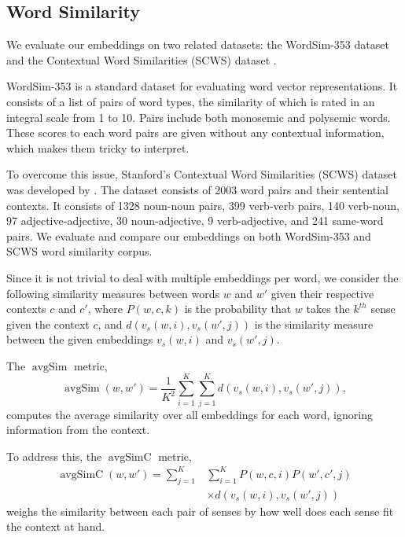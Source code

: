 \documentclass[11pt,a4paper]{article}
\DeclareMathOperator*{\avgSim}{avgSim}
\DeclareMathOperator*{\avgSimC}{avgSimC}
\begin{document}
\subsection{Word Similarity}
\label{sec:word-similarity}

We evaluate our embeddings on two related datasets: the WordSim-353
\cite{finkelstein:2001} dataset and the Contextual Word Similarities
(SCWS) dataset .

WordSim-353 is a standard dataset for evaluating word vector
representations. It consists of a list of pairs of word types, the
similarity of which is rated in an integral scale from 1 to 10. Pairs
include both monosemic and polysemic words. These scores to each word
pairs are given without any contextual information, which makes them
tricky to interpret. 

To overcome this issue, Stanford's Contextual Word Similarities (SCWS)
dataset was developed by . The dataset consists of
2003 word pairs and their sentential contexts. It consists of 1328
noun-noun pairs, 399 verb-verb pairs, 140 verb-noun, 97
adjective-adjective, 30 noun-adjective, 9 verb-adjective, and 241
same-word pairs. We evaluate and compare our embeddings on both
WordSim-353 and SCWS word similarity corpus.

Since it is not trivial to deal with multiple embeddings per word, we
consider the following similarity measures between words $w$ and $w'$
given their respective contexts $c$ and $c'$, where $P(w, c, k)$ is
the probability that $w$ takes the $k^{th}$ sense given the context
$c$, and $d(v_s(w, i), v_s(w', j))$ is the similarity measure between
the given embeddings $v_s(w, i)$ and $v_s(w', j)$.

The $\avgSim$ metric,
\begin{dmath*}
\avgSim(w, w') = 
    \frac{1}{K^{2}} \sum_{i=1}^{K} \sum_{j=1}^{K} d\left(v_s(w, i), v_s(w', j)\right),
\end{dmath*}
computes the average similarity over all embeddings for each word, ignoring
information from the context.

To address this, the $\avgSimC$ metric,
\begin{align*}
\avgSimC(w,w') = 
    \sum_{j=1}^{K} & \sum_{i=1}^{K} P(w,c, i) P(w',c',j) \\ & \times d\left(v_s(w, i), v_s(w', j)\right)
\end{align*}
weighs the similarity between each pair of senses by how well does
each sense fit the context at hand.
\end{document}
